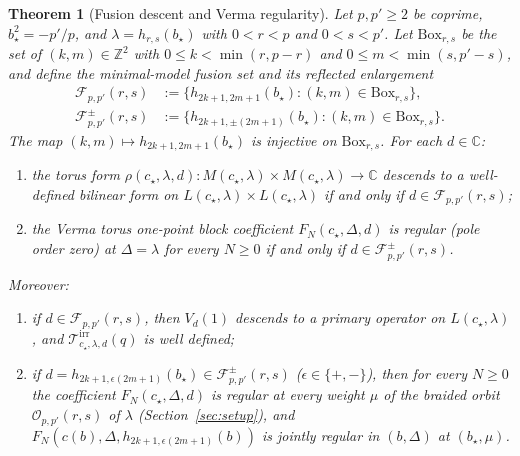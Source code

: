 \documentclass[twoside,10pt]{article}
\numberwithin{equation}{section}
\theoremstyle{slbody}
\newtheorem{theorem}{Theorem}[section]
\theoremstyle{definition}
\theoremstyle{remark}
\begin{document}
\begin{theorem}[Fusion descent and Verma regularity]\label{thm:descent-regularity}
Let \(p,p'\geq2\) be coprime, \(b_\star^2=-p'/p\), and
\(\lambda=h_{r,s}(b_\star)\) with \(0<r<p\) and \(0<s<p'\).  Let
\(\mathrm{Box}_{r,s}\) be the set of \((k,m)\in\mathbb Z^2\) with
\(0\leq k<\min(r,p-r)\) and \(0\leq m<\min(s,p'-s)\), and define the
minimal-model fusion set and its reflected enlargement
\begin{align}
 \mathcal{F}_{p,p'}(r,s)
 &:=\bigl\{h_{2k+1,2m+1}(b_\star):(k,m)\in\mathrm{Box}_{r,s}\bigr\},
   \label{eq:fusion-set}\\
 \mathcal{F}^\pm_{p,p'}(r,s)
 &:=\bigl\{h_{2k+1,\pm(2m+1)}(b_\star):(k,m)\in\mathrm{Box}_{r,s}\bigr\}.
   \label{eq:fusion-set-pm}
\end{align}
The map \((k,m)\mapsto h_{2k+1,2m+1}(b_\star)\) is injective on
\(\mathrm{Box}_{r,s}\).  For each \(d\in\mathbb{C}\):
\begin{enumerate}
 \item[(i)] the torus form
   \(\rho(c_\star,\lambda,d):M(c_\star,\lambda)\times M(c_\star,\lambda)\to\mathbb{C}\)
   descends to a well-defined bilinear form on
   \(L(c_\star,\lambda)\times L(c_\star,\lambda)\) if and only if
   \(d\in\mathcal{F}_{p,p'}(r,s)\);
 \item[(ii)] the Verma torus one-point block coefficient
   \(F_N(c_\star,\Delta,d)\) is regular (pole order zero) at \(\Delta=\lambda\)
   for every \(N\geq0\) if and only if \(d\in\mathcal{F}^\pm_{p,p'}(r,s)\).
\end{enumerate}
Moreover:
\begin{enumerate}
 \item[(iii)] if \(d\in\mathcal{F}_{p,p'}(r,s)\), then \(V_d(1)\) descends to
   a primary operator on \(L(c_\star,\lambda)\), and
   \(\mathcal{T}^{\mathrm{irr}}_{c_\star,\lambda,d}(q)\) is well defined;
 \item[(iv)] if \(d=h_{2k+1,\epsilon(2m+1)}(b_\star)\in\mathcal{F}^\pm_{p,p'}(r,s)\)
   (\(\epsilon\in\{+,-\}\)), then for every \(N\geq0\) the coefficient
   \(F_N(c_\star,\Delta,d)\) is regular at every weight \(\mu\) of the braided
   orbit \(\mathcal{O}_{p,p'}(r,s)\) of \(\lambda\)
   (Section~\ref{sec:setup}), and
   \(F_N(c(b),\Delta,h_{2k+1,\epsilon(2m+1)}(b))\) is jointly regular in
   \((b,\Delta)\) at \((b_\star,\mu)\).
\end{enumerate}
\end{theorem}
\end{document}
